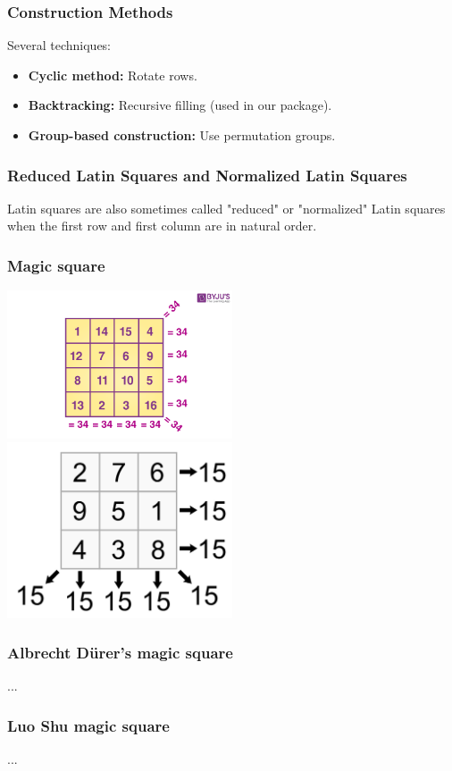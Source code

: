 \documentclass{beamer}
\begin{document}
\begin{frame}
\frametitle{Construction Methods}
Several techniques:
\begin{itemize}
  \item \textbf{Cyclic method:} Rotate rows.
  \item \textbf{Backtracking:} Recursive filling (used in our package).
  \item \textbf{Group-based construction:} Use permutation groups.
\end{itemize}
\end{frame}

\begin{frame}
\frametitle{Reduced Latin Squares and Normalized Latin Squares}
Latin squares are also sometimes called "reduced" or "normalized" Latin squares when the first row and first column are in natural order. 
\end{frame}

\begin{frame}
\frametitle{Magic square}
\includegraphics[width=0.5\textwidth]{img13}
\includegraphics[width=0.5\textwidth]{img14}
\end{frame}

\begin{frame}
\frametitle{Albrecht Dürer's magic square}
...
\end{frame}

\begin{frame}
\frametitle{Luo Shu magic square}
...
\end{frame}
\end{document}

